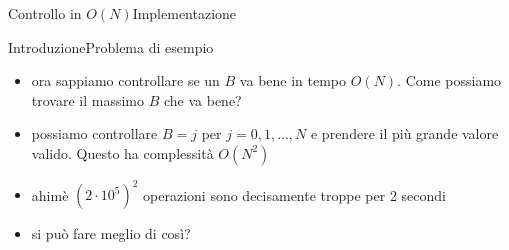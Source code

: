 \documentclass{beamer}
\begin{document}
\begin{frame}{Controllo in $O(N)$}{Implementazione}
\end{frame}

\begin{frame}[t]{Introduzione}{Problema di esempio}
    \begin{itemize}
        \item ora sappiamo controllare se un $B$ va bene in tempo $O(N)$. Come possiamo trovare il massimo $B$ che va bene?
        \pause
        \item possiamo controllare $B = j$ per $j = 0, 1, \dots, N$ e prendere il pi\`u grande valore valido. Questo ha complessit\`a $O(N^2)$
        \pause
        \item ahim\`e $(2 \cdot 10^5)^2$ operazioni sono decisamente troppe per 2 secondi
        \pause
        \item si pu\`o fare meglio di cos\`i?
    \end{itemize}
\end{frame}
\end{document}
